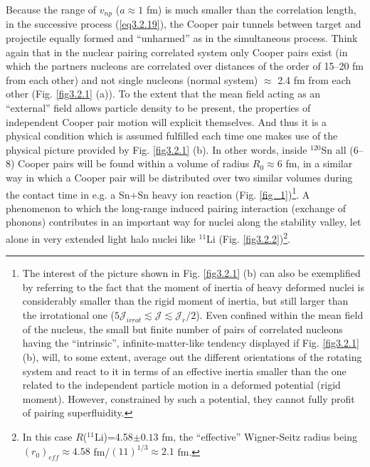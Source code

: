  Because the range of $v_{np}$ ($a\approx 1$ fm) is much smaller than the correlation length, in the successive process (\ref{eq3.2.19}), the Cooper pair tunnels between target and projectile equally formed and ``unharmed'' as in the simultaneous process. Think again that in the nuclear pairing correlated system only Cooper pairs exist  (in which the partners nucleons are correlated over distances of the order of 15--20 fm from each other) and not single nucleons (normal system)  $\approx$ 2.4 fm  from each other (Fig. \ref{fig3.2.1} (a)). To the extent that the mean field acting as an ``external'' field allows particle density to be present, the properties of independent Cooper pair motion will explicit themselves. And thus it is a physical condition which is assumed fulfilled each time one  makes use of the physical picture provided by Fig. \ref{fig3.2.1} (b). In other words, inside $^{120}$Sn all (6--8) Cooper pairs will be found within a volume of radius $R_0\approx 6$ fm, in a similar way in which a Cooper pair will be distributed over two similar volumes during the contact time  in e.g. a Sn+Sn heavy ion reaction (Fig. \ref{fig_1})\footnote{The interest of the  picture shown in Fig. \ref{fig3.2.1} (b) can also be exemplified by referring to the fact that the moment of inertia of heavy deformed nuclei is considerably smaller than the rigid moment of inertia, but still larger than the irrotational one ($5\mathcal J_{irrot}\lesssim\mathcal J\lesssim  \mathcal J_r/2$). Even confined within the mean field of the nucleus, the small but finite number of pairs of correlated nucleons having the ``intrinsic'', infinite-matter-like tendency displayed if Fig. \ref{fig3.2.1} (b), will, to some extent, average out the different orientations of the rotating system and react to it in terms of an effective inertia smaller than the one related to the independent particle motion in a deformed potential (rigid moment). However, constrained by such a potential, they cannot fully profit of pairing superfluidity.}.  A phenomenon to which the long-range induced pairing interaction (exchange of phonons) contributes in an important way for nuclei along the stability valley, let alone in very extended light halo nuclei like $^{11}$Li (Fig. \ref{fig3.2.2})\footnote{In this case $R$($^{11}$Li)=4.58$\pm0.13$ fm, the ``effective'' Wigner-Seitz radius being $(r_0)_{eff}\approx 4.58$ fm/$(11)^{1/3}\approx2.1$ fm.}.


